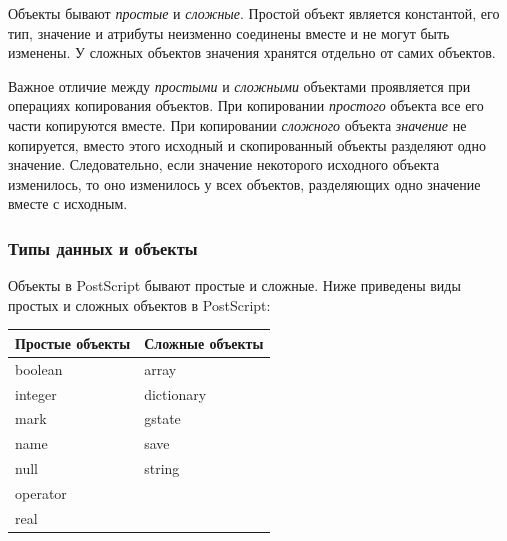 \documentclass[14pt]{extarticle}
\begin{document}
Объекты бывают \textit{простые} и \textit{сложные}. Простой объект является константой, его тип, значение и атрибуты неизменно соединены вместе и не могут быть изменены. У сложных объектов значения хранятся отдельно от самих объектов. 

Важное отличие между \textit{простыми} и \textit{сложными} объектами проявляется при операциях копирования объектов. При копировании \textit{простого} объекта все его части копируются вместе. При копировании \textit{сложного} объекта \textit{значение} не копируется, вместо этого исходный и скопированный объекты разделяют одно значение.
Следовательно, если значение некоторого исходного объекта изменилось, то оно изменилось у всех объектов, разделяющих одно значение вместе с исходным.



\subsubsection*{Типы данных и объекты}

Объекты в PostScript бывают простые и сложные. Ниже приведены виды простых и сложных объектов в PostScript:

\begin{center}

\begin{tabular}[t]{|p{12em}|p{12em}|}
\hline
Простые объекты & Сложные объекты\\
\hline
boolean & array\\
integer & dictionary\\
mark & gstate\\
name & save\\
null & string\\
operator & \\
real & \\
\hline
\end{tabular}

\end{center}
$$ $$
\end{document}
